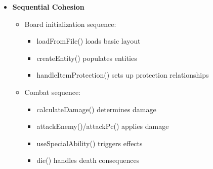 \documentclass{article}
\begin{document}
\begin{itemize}
    \item \textbf{Sequential Cohesion}
    \begin{itemize}
        \item Board initialization sequence:
        \begin{itemize}
            \item loadFromFile() loads basic layout
            \item createEntity() populates entities
            \item handleItemProtection() sets up protection relationships
        \end{itemize}
        \item Combat sequence:
        \begin{itemize}
            \item calculateDamage() determines damage
            \item attackEnemy()/attackPc() applies damage
            \item useSpecialAbility() triggers effects
            \item die() handles death consequences
        \end{itemize}
    \end{itemize}
\end{itemize}
\end{document}
